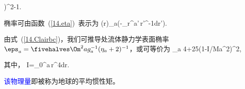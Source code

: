 \right)^2-1.
\en

椭率可由函数~(\ref{14.eta})~表示为
\eq \label{14.ellipticity}
\eps(r)\approx\eps_a\exp\left(-\int_r^a\eta'\,r'^{-1}dr'\right).
\en

由式~(\ref{14.Clairbc})，我们可推导处流体静力学表面椭率~$\eps_a=\fivehalves\Om^2ag_a^{-1}(\eta_a+2)^{-1}$，或可等价为
\eq \label{14.surfell}
\eps_a\approx{}
{4+25(1-\threehalves I/Ma^2)^2},
\en

其中，
\eq \label{14.momindef}
I=\eightthirds\pi\int_0^a\rho\,r^4dr.
\en

\textcolor{blue}{该物理量}即被称为地球的平均惯性矩。
%

